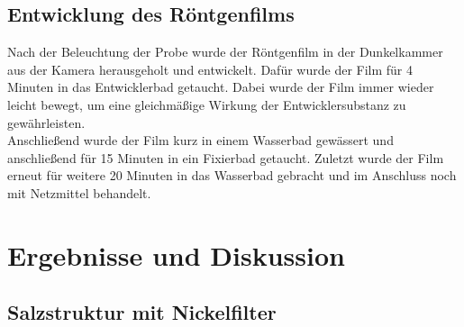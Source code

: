\documentclass[a4paper,twoside,final]{article}
\begin{document}
\subsection{Entwicklung des Röntgenfilms}
Nach der Beleuchtung der Probe wurde der Röntgenfilm in der Dunkelkammer aus der Kamera herausgeholt und entwickelt. Dafür wurde der Film für 4 Minuten in das Entwicklerbad getaucht. Dabei wurde der Film immer wieder leicht bewegt, um eine gleichmäßige Wirkung der Entwicklersubstanz zu gewährleisten.\\
Anschließend wurde der Film kurz in einem Wasserbad gewässert und anschließend für 15 Minuten in ein Fixierbad getaucht. Zuletzt wurde der Film erneut für weitere 20 Minuten in das Wasserbad gebracht und im Anschluss noch mit Netzmittel behandelt.


\newpage
\section{Ergebnisse und Diskussion}
\subsection{Salzstruktur mit Nickelfilter}
\end{document}
